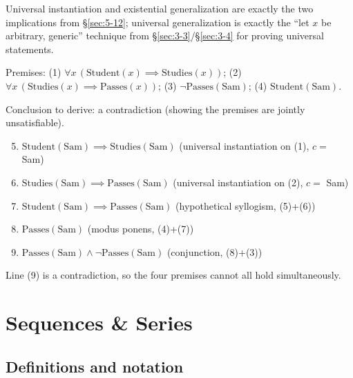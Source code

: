 \documentclass[11pt]{article}
\begin{document}
\begin{note}
Universal instantiation and existential generalization are exactly the two implications from \S\ref{sec:5-12}; universal generalization is exactly the ``let $x$ be arbitrary, generic'' technique from \S\ref{sec:3-3}/\S\ref{sec:3-4} for proving universal statements.
\end{note}

\bigskip
\begin{example}
Premises: (1) $\forall x\,(\mathrm{Student}(x)\implies\mathrm{Studies}(x))$; (2) $\forall x\,(\mathrm{Studies}(x)\implies\mathrm{Passes}(x))$; (3) $\neg\mathrm{Passes}(\text{Sam})$; (4) $\mathrm{Student}(\text{Sam})$.

Conclusion to derive: a contradiction (showing the premises are jointly unsatisfiable).

\begin{enumerate}[label=(\arabic*)]
    \setcounter{enumi}{4}
    \item $\mathrm{Student}(\text{Sam})\implies\mathrm{Studies}(\text{Sam})$ \hfill (universal instantiation on (1), $c=$ Sam)
    \item $\mathrm{Studies}(\text{Sam})\implies\mathrm{Passes}(\text{Sam})$ \hfill (universal instantiation on (2), $c=$ Sam)
    \item $\mathrm{Student}(\text{Sam})\implies\mathrm{Passes}(\text{Sam})$ \hfill (hypothetical syllogism, (5)+(6))
    \item $\mathrm{Passes}(\text{Sam})$ \hfill (modus ponens, (4)+(7))
    \item $\mathrm{Passes}(\text{Sam}) \wedge \neg\mathrm{Passes}(\text{Sam})$ \hfill (conjunction, (8)+(3))
\end{enumerate}
Line (9) is a contradiction, so the four premises cannot all hold simultaneously.
\end{example}

\newpage
\section{Sequences \& Series}

\subsection{Definitions and notation}
\label{sec:6-1}
\end{document}
